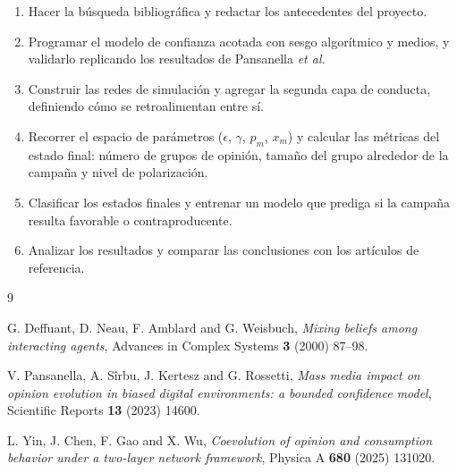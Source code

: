 \documentclass[11pt]{article}
\begin{document}
\begin{enumerate}
	\item Hacer la búsqueda bibliográfica y redactar los antecedentes del proyecto.

	\item Programar el modelo de confianza acotada con sesgo algorítmico y medios, y validarlo
	      replicando los resultados de Pansanella \emph{et al.}

	\item Construir las redes de simulación y agregar la segunda capa de conducta, definiendo
	      cómo se retroalimentan entre sí.

	\item Recorrer el espacio de parámetros ($\epsilon$, $\gamma$, $p_m$, $x_m$) y calcular las
	      métricas del estado final: número de grupos de opinión, tamaño del grupo alrededor de
	      la campaña y nivel de polarización.

	\item Clasificar los estados finales y entrenar un modelo que prediga si la campaña resulta
	      favorable o contraproducente.

	\item Analizar los resultados y comparar las conclusiones con los artículos de referencia.
\end{enumerate}

\begin{thebibliography}{9}
\setlength{\itemsep}{3pt}

G. Deffuant, D. Neau, F. Amblard and G. Weisbuch, \emph{Mixing beliefs among interacting agents}, Advances in Complex Systems \textbf{3} (2000) 87--98.

V. Pansanella, A. Sîrbu, J. Kertesz and G. Rossetti, \emph{Mass media impact on opinion evolution in biased digital environments: a bounded confidence model}, Scientific Reports \textbf{13} (2023) 14600.

L. Yin, J. Chen, F. Gao and X. Wu, \emph{Coevolution of opinion and consumption behavior under a two-layer network framework}, Physica A \textbf{680} (2025) 131020.

\end{thebibliography}
\end{document}
